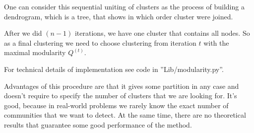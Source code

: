 One can consider this sequential uniting of clusters as the process of building a dendrogram, which is a tree, that shows in which order cluster were joined.

After we did $(n-1)$ iterations, we have one cluster that contains all nodes. So as a final clustering we need to choose clustering from iteration $t$ with the maximal modularity $Q^{(t)}$.

For technical details of implementation see code in ''Lib/modularity.py''.

Advantages of this procedure are that it gives some partition in any case and doesn't require to specify the number of clusters that we are looking for. It's good, because in real-world problems we rarely know the exact number of communities that we want to detect. At the same time, there are no theoretical results that guarantee some good performance of the method.



\begin{equation}
    \begin{aligned}
    \nonumber
    \end{aligned}
\end{equation}
